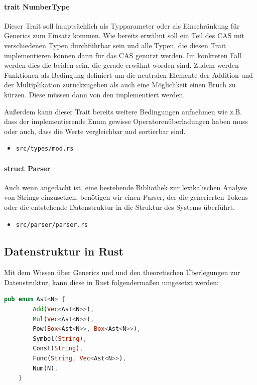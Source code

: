 \documentclass[11pt,a4paper, ngerman]{article}
\begin{document}
\paragraph{trait NumberType} Dieser Trait soll hauptsächlich als Typparameter oder als Einschränkung für Generics zum Einsatz kommen. Wie bereits erwähnt soll ein Teil des CAS mit verschiedenen Typen durchführbar sein und alle Typen, die diesen Trait implementieren können dann für das CAS genutzt werden. Im konkreten Fall werden dies die beiden  sein, die gerade erwähnt worden sind. Zudem werden Funktionen als Bedingung definiert um die neutralen Elemente der Addition und der Multiplikation zurückzugeben als auch eine Möglichkeit einen Bruch zu kürzen. Diese müssen dann von den  implementiert werden.

Außerdem kann dieser Trait bereits weitere Bedingungen aufnehmen wie z.B. dass der implementierende Enum gewisse Operatorenüberladungen haben muss oder auch, dass die Werte vergleichbar und sortierbar sind.

\begin{itemize}
    \item \begin{verbatim}src/types/mod.rs\end{verbatim}
\end{itemize}

\paragraph{struct Parser} Auch wenn angedacht ist, eine bestehende Bibliothek zur lexikalischen Analyse von Strings einzusetzen, benötigen wir einen Parser, der die generierten Tokens oder die entstehende Datenstruktur in die Struktur des Systems überführt.

\begin{itemize}
    \item \begin{verbatim}src/parser/parser.rs\end{verbatim}
\end{itemize}

\subsection{Datenstruktur in Rust}
Mit dem Wissen über Generics und und den theoretischen Überlegungen zur Datenstruktur, kann diese in Rust folgendermaßen umgesetzt werden:
\begin{lstlisting}[language=rust, caption={Datenstruktur in Rust}]
    pub enum Ast<N> {
        Add(Vec<Ast<N>>),
        Mul(Vec<Ast<N>>),
        Pow(Box<Ast<N>>, Box<Ast<N>>),
        Symbol(String),
        Const(String),
        Func(String, Vec<Ast<N>>),
        Num(N),
    }
\end{lstlisting}
\end{document}
